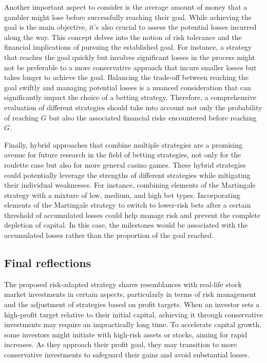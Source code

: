 \documentclass[11pt,twoside]{article}
\numberwithin{Theorem}{section}
\numberwithin{Definition}{section}
\numberwithin{Lemma}{section}
\numberwithin{Algorithm}{section}
\numberwithin{equation}{section}
\begin{document}
Another important aspect to consider is the average amount of money that a gambler might lose before successfully reaching their goal. While achieving the goal is the main objective, it's also crucial to assess the potential losses incurred along the way. This concept delves into the notion of risk tolerance and the financial implications of pursuing the established goal. For instance, a strategy that reaches the goal quickly but involves significant losses in the process might not be preferable to a more conservative approach that incurs smaller losses but takes longer to achieve the goal. Balancing the trade-off between reaching the goal swiftly and managing potential losses is a nuanced consideration that can significantly impact the choice of a betting strategy. Therefore, a comprehensive evaluation of different strategies should take into account not only the probability of reaching $G$ but also the associated financial risks encountered before reaching $G$.

Finally, hybrid approaches that combine multiple strategies are a promising avenue for future research in the field of betting strategies, not only for the roulette case but also for more general casino games. These hybrid strategies could potentially leverage the strengths of different strategies while mitigating their individual weaknesses. For instance, combining elements of the Martingale strategy with a mixture of low, medium, and high bet types. Incorporating elements of the Martingale strategy to switch to lower-risk bets after a certain threshold of accumulated losses could help manage risk and prevent the complete depletion of capital. In this case, the milestones would be associated with the accumulated losses rather than the proportion of the goal reached.

\subsection{Final reflections}
The proposed risk-adapted strategy shares resemblances with real-life stock market investments in certain aspects, particularly in terms of risk management and the adjustment of strategies based on profit targets. When an investor sets a high-profit target relative to their initial capital, achieving it through conservative investments may require an impractically long time. To accelerate capital growth, some investors might initiate with high-risk assets or stocks, aiming for rapid increases. As they approach their profit goal, they may transition to more conservative investments to safeguard their gains and avoid substantial losses. 
\end{document}
